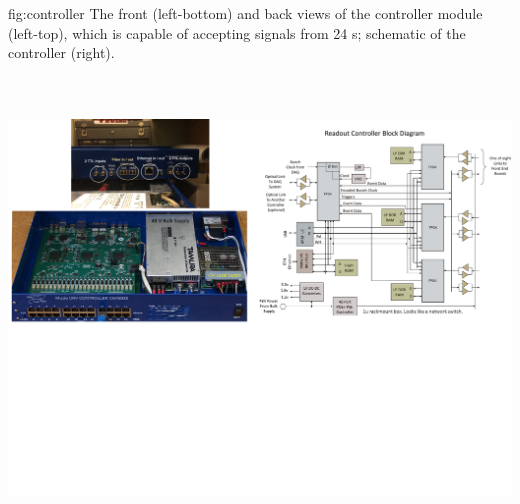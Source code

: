 \begin{dunefigure}
 {fig:controller}
 {The front (left-bottom) and back views of the controller module (left-top), which is capable of accepting signals from 24 s; schematic of the controller (right).}
\includegraphics[height=5.1in]{graphics/pds-controller.pdf} 
\vspace{-5.5cm}
\end{dunefigure}

